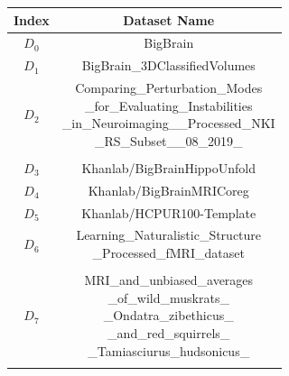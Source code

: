 \documentclass[conference]{IEEEtran}
\begin{document}


\begin{table}
    \centering
    \begin{tabular}{cc}
        \hline
        Index & Dataset Name  \\
        \hline 
        $D_{0}$ & BigBrain \\[5pt]
        $D_{1}$ & BigBrain\_3DClassifiedVolumes\\[5pt]
        $D_{2}$ & \parbox{3cm}{Comparing\_Perturbation\_Modes\\
        \_for\_Evaluating\_Instabilities\\
        \_in\_Neuroimaging\_\_Processed\_NKI\\
        \_RS\_Subset\_\_08\_2019\_}\\[5pt]
                &\\
        $D_{3}$ & Khanlab/BigBrainHippoUnfold\\ [5pt]      
        $D_{4}$ & Khanlab/BigBrainMRICoreg\\[5pt]
        $D_{5}$ & Khanlab/HCPUR100-Template\\[5pt]
        $D_{6}$ & \parbox{3cm}{Learning\_Naturalistic\_Structure\\
        \_Processed\_fMRI\_dataset}\\[5pt]
                 &\\
        $D_{7}$ & \parbox{3cm}{MRI\_and\_unbiased\_averages\\
        \_of\_wild\_muskrats\_\\
        \_Ondatra\_zibethicus\_\\
        \_and\_red\_squirrels\_\\
        \_Tamiasciurus\_hudsonicus\_} \\[5pt]
                 &\\        
                 

\end{tabular}
\end{table}
\end{document}

